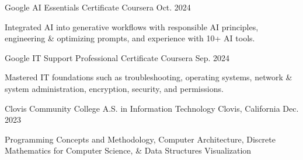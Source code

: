 \begin{cventries}

	\cventry
	{Google} %
	{AI Essentials Certificate} %
	{Coursera} %
	{Oct. 2024} %
	{
		\begin{cvitems} %
		\item{Integrated AI into generative workflows with responsible AI principles, engineering \& optimizing prompts, and experience with 10+ AI tools.}
		\end{cvitems}
	}

	\cventry
	{Google} %
	{IT Support Professional Certificate} %
	{Coursera} %
	{Sep. 2024} %
	{
		\begin{cvitems} %
		\item{Mastered IT foundations such as troubleshooting, operating systems, network \& system administration, encryption, security, and permissions.}
		\end{cvitems}
	}

	\cventry
	{Clovis Community College} %
	{A.S. in Information Technology} %
	{Clovis, California} %
	{Dec. 2023} %
	{
		\begin{cvitems} %
		\item{Programming Concepts and Methodology, Computer Architecture, Discrete Mathematics for Computer Science, \& Data Structures Visualization}
		\end{cvitems}
	}

\end{cventries}
